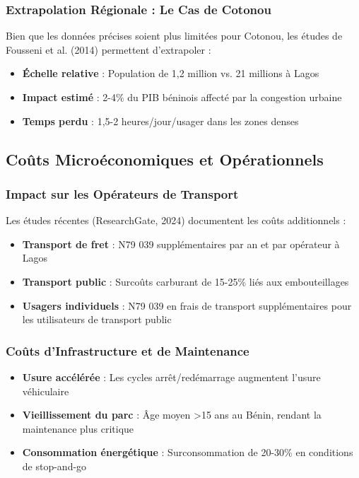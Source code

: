 \subsubsection{Extrapolation Régionale : Le Cas de Cotonou}
Bien que les données précises soient plus limitées pour Cotonou, les études de Fousseni et al. (2014) \cite{fousseni2014} permettent d'extrapoler :
\begin{itemize}
    \item \textbf{Échelle relative} : Population de 1,2 million vs. 21 millions à Lagos
    \item \textbf{Impact estimé} : 2-4\% du PIB béninois affecté par la congestion urbaine
    \item \textbf{Temps perdu} : 1,5-2 heures/jour/usager dans les zones denses
\end{itemize}

\subsection{Coûts Microéconomiques et Opérationnels}

\subsubsection{Impact sur les Opérateurs de Transport}
Les études récentes (ResearchGate, 2024) \cite{researchgate2024} documentent les coûts additionnels :
\begin{itemize}
    \item \textbf{Transport de fret} : N79 039 supplémentaires par an et par opérateur à Lagos
    \item \textbf{Transport public} : Surcoûts carburant de 15-25\% liés aux embouteillages
    \item \textbf{Usagers individuels} : N79 039 en frais de transport supplémentaires pour les utilisateurs de transport public
\end{itemize}

\subsubsection{Coûts d'Infrastructure et de Maintenance}
\begin{itemize}
    \item \textbf{Usure accélérée} : Les cycles arrêt/redémarrage augmentent l'usure véhiculaire
    \item \textbf{Vieillissement du parc} : Âge moyen >15 ans au Bénin, rendant la maintenance plus critique
    \item \textbf{Consommation énergétique} : Surconsommation de 20-30\% en conditions de stop-and-go
\end{itemize}

